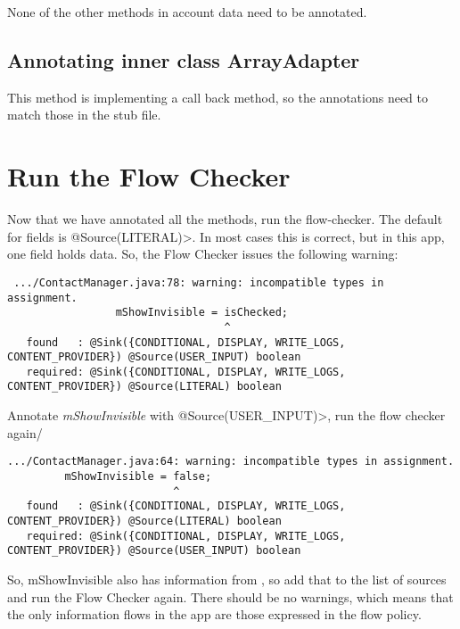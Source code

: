 None of the other methods in account data need to be annotated.


\subsection{Annotating inner class ArrayAdapter}

        This method is implementing a call back method, so the annotations need to match 
        those in the stub file.


\section{Run the Flow Checker}

Now that we have annotated all the methods, run the flow-checker. The default for fields is 
\<@Source(LITERAL)>.  In most cases this is correct, but in this app, one field holds 
 data. So, the Flow Checker issues the following warning:


\begin{Verbatim}
 .../ContactManager.java:78: warning: incompatible types in assignment.
                 mShowInvisible = isChecked;
                                  ^
   found   : @Sink({CONDITIONAL, DISPLAY, WRITE_LOGS, CONTENT_PROVIDER}) @Source(USER_INPUT) boolean
   required: @Sink({CONDITIONAL, DISPLAY, WRITE_LOGS, CONTENT_PROVIDER}) @Source(LITERAL) boolean
 \end{Verbatim}

Annotate \emph{mShowInvisible} with \<@Source(USER\_INPUT)>, run the flow checker again/

\begin{Verbatim}
.../ContactManager.java:64: warning: incompatible types in assignment.
         mShowInvisible = false;
                          ^
   found   : @Sink({CONDITIONAL, DISPLAY, WRITE_LOGS, CONTENT_PROVIDER}) @Source(LITERAL) boolean
   required: @Sink({CONDITIONAL, DISPLAY, WRITE_LOGS, CONTENT_PROVIDER}) @Source(USER_INPUT) boolean
\end{Verbatim}

So, mShowInvisible  also has information from , so add that to the list of sources and run the Flow Checker again.  There should be no warnings, which means that the only information flows in the app are those expressed in the flow policy. 
%
%
%
%
